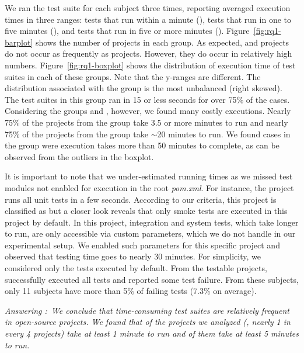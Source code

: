 We ran the test suite for each subject three times, reporting averaged
execution times in three ranges: tests that run within a minute
(\shortg{}), tests that run in one to five minutes (\medg{}), and
tests that run in five or more minutes (\longg{}). Figure~\ref{fig:rq1-barplot} shows the number of projects in
each group.  As expected, \longg{} and \medg{} projects do not occur
as frequently as \shortg{} projects.  However, they do occur in
relatively high numbers.
Figure~\ref{fig:rq1-boxplot} shows the distribution of execution time of
test suites in each of these groups.
Note that the y-ranges are different.
The distribution associated with the \shortg{} group is the most
unbalanced (right skewed).
The test suites in this group ran in 15 or less seconds for
over 75\% of the cases. Considering the groups \medg{} and \longg{},
however, we found many costly executions.  Nearly 75\% of the projects
from the \medg{} group take 3.5 or more minutes to run and nearly 75\% of
the projects from the \longg{} group take $\sim$20 minutes to run.  We
found cases in the \longg{} group were execution takes more than 50 minutes
to complete, as can be observed from the outliers in the boxplot.

It is important to note that we under-estimated running times as we missed test modules not enabled for
execution in the root \emph{pom.xml}. For instance, the project 
runs all unit tests in a few seconds.  According to our criteria, this
project is classified as \shortg{} but a closer look reveals
that only smoke tests are executed in this project by default.
In this project, integration and system tests, which take longer to run, are only accessible via
custom parameters, which we do not handle in our experimental setup.
We enabled such parameters for this specific project and observed that
testing time goes to nearly 30 minutes.  For simplicity, we considered
only the tests executed by default.
From the \numSubjs{} testable projects, \numSubjsPass{} successfully
executed all tests and \numSubjsFail{} reported some test failure.
From these \numSubjsFail{} subjects, only 11 subjects
have more than 5\% of failing tests (7.3\% on average).
\begin{mdframed}
\noindent\textit{Answering \numRQFeasibilityOne{}:}~\emph{We conclude that
    time-consuming test suites are relatively frequent in
    open-source projects.  We found that \percentMedLongRunning{} of
    the \numSubjs{} projects we analyzed (\ie{}, nearly 1 in every 4
    projects) take at least 1 minute to run and
    \percentLongRunning{} of them take at least 5 minutes to run.}
\end{mdframed}


